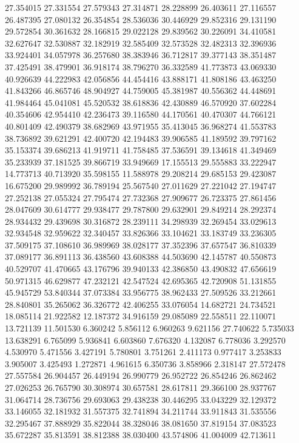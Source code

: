 27.354015
27.331554
27.579343
27.314871
28.228899
26.403611
27.116557
26.487395
27.080132
26.354854
28.536036
30.446929
29.852316
29.131190
29.572854
30.361632
28.166815
29.022128
29.839562
30.226091
34.410581
32.627647
32.530887
32.182919
32.585409
32.573528
32.482313
32.396936
33.924401
34.057978
36.257680
38.383946
36.712817
39.377143
38.351487
37.425491
38.479901
36.918174
38.796270
36.332589
41.773873
43.069330
40.926639
44.222983
42.056856
44.454416
43.888171
41.808186
43.463250
41.843266
46.865746
48.904927
44.759005
45.381987
40.556362
44.448691
41.984464
45.041081
45.520532
38.618836
42.430889
46.570920
37.602284
40.354606
42.954410
42.236473
39.116580
44.170561
40.470307
44.766121
40.801409
42.490379
38.682969
43.971955
35.413045
36.968274
41.553783
38.736892
39.621291
42.400720
42.194483
39.906585
41.189592
39.797162
35.153374
39.686213
41.919711
41.758485
37.536591
39.134618
41.349469
35.233939
37.181525
39.866719
33.949669
17.155513
29.555883
33.222947
14.773713
40.713920
35.598155
11.588978
29.208214
29.685153
29.423087
16.675200
29.989992
36.789194
25.567540
27.011629
27.221042
27.194747
27.252138
27.055324
27.795474
27.732368
27.909677
26.723375
27.861456
28.047609
30.614777
29.938477
29.787800
29.632901
29.849214
28.292374
28.934432
29.439698
30.316872
28.239111
34.298939
32.269454
33.029613
32.934548
32.959622
32.340457
33.826366
33.104621
33.183749
33.236305
37.509175
37.108610
36.989969
38.028177
37.352396
37.657547
36.810339
37.089177
36.891113
36.438560
43.608388
44.503690
42.145787
40.550873
40.529707
41.470665
43.176796
39.940133
42.386850
43.490832
47.656619
50.971315
46.629877
47.232121
42.547524
42.695365
42.720908
51.131855
45.945729
53.840344
37.073384
33.956775
38.962433
27.509526
33.212661
28.840801
35.265062
36.326772
42.406255
33.076054
14.682721
24.734521
18.085114
21.922582
12.187372
34.916159
29.085089
22.558511
22.110071
13.721139
11.501530
6.360242
5.856112
6.960263
9.621156
27.740622
5.735033
13.638291
6.765099
5.936841
6.603860
7.676320
4.132087
6.778036
3.292570
4.530970
5.471556
3.427191
5.780801
3.751261
2.411173
0.977417
3.253833
3.905007
3.425493
1.272871
4.961615
6.350736
3.858966
2.318147
27.572478
27.557584
26.904457
26.449194
26.990779
26.952722
26.854246
26.862462
27.026253
26.765790
30.308974
30.657581
28.617811
29.366100
28.937767
31.064714
28.736756
29.693063
29.438238
30.446295
33.043229
32.129372
33.146055
32.181932
31.557375
32.741894
34.211744
33.911843
31.535556
32.295467
37.888929
35.822044
38.328046
38.081650
37.819154
37.083523
35.672287
35.813591
38.812388
38.030400
43.574806
41.004009
42.713611
